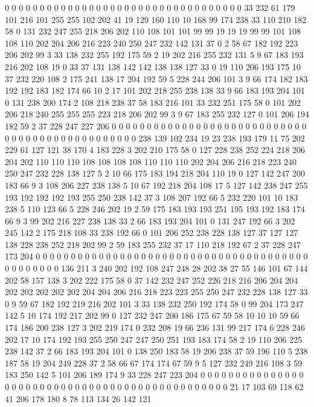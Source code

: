 0 0 0 0 0 0 0 0 0 0 0 0 0 0 0 0 0 0 0 0
0 0 0 0 0 0 0 0 0 0 0 0 0 0 33 232 61 179 101 216
101 255 255 102 202 41 19 129 160 110 10 168 99 174 238 33 110 210 182 58
0 131 232 247 255 218 206 202 110 108 101 101 99 99 19 19 19 99 99 101
108 108 110 202 204 206 216 223 240 250 247 232 142 131 37 0 2 58 67 182
192 223 206 202 99 3 33 138 232 255 192 175 59 2 19 202 216 255 232 131
5 9 67 183 193 216 202 108 19 0 33 37 131 138 142 142 138 138 127 33
0 19 110 206 193 175 10 37 232 220 108 2 175 241 138 17 204 192 59 5
228 244 206 101 3 9 66 174 182 183 192 192 183 182 174 66 10 2 17 101
202 218 255 238 138 33 9 66 183 193 204 101 0 131 238 200 174 2 108 218
238 37 58 183 216 101 33 232 251 175 58 0 101 202 206 218 240 255 255 255
223 218 206 202 99 3 9 67 183 255 232 127 0 101 206 194 182 59 2 37
228 247 227 206 0 0 0 0 0 0 0 0 0 0 0 0 0 0 0 0
0 0 0 0 0 0 0 0 0 0 0 0 0 0 0 0 0 0 0 0
0 0 0 0 0 0 0 0 0 0 0 238 139 102 234 19 23 238 193 179
11 75 202 229 61 127 121 38 170 4 183 228 3 202 210 175 58 0 127 228
238 252 224 218 206 204 202 110 110 110 108 108 108 108 110 110 110 202 204 206
216 218 223 240 250 247 232 228 138 127 5 2 10 66 175 183 194 218 204 110
19 0 127 142 247 200 183 66 9 3 108 206 227 238 138 5 10 67 192 218
204 108 17 5 127 142 238 247 255 193 192 192 192 193 255 250 238 142 37 3
108 207 192 66 5 232 220 101 10 183 238 5 110 123 66 5 228 246 202 19
2 59 175 183 193 193 251 195 193 192 183 174 66 9 3 99 202 216 227 238
138 33 2 66 183 193 204 101 0 131 247 192 66 3 202 245 142 2 175 218
108 33 238 192 66 0 101 206 252 238 228 138 127 37 127 127 138 228 238 252
218 202 99 2 59 183 255 232 37 17 110 218 192 67 2 37 228 247 173 204
0 0 0 0 0 0 0 0 0 0 0 0 0 0 0 0 0 0 0 0
0 0 0 0 0 0 0 0 0 0 0 0 0 0 0 0 0 0 0 0
0 0 0 0 0 0 0 136 211 3 240 202 192 108 247 248 28 202 38 27
55 146 101 67 144 202 58 157 138 3 202 222 175 58 0 37 142 232 247 252
226 218 216 206 204 204 202 202 202 202 202 204 204 206 216 218 223 223 255 250
247 232 228 138 127 33 0 9 59 67 182 192 219 216 202 101 3 33 138 232
250 192 174 58 0 99 204 173 247 142 5 10 174 192 217 202 99 0 127 232
247 200 186 175 67 59 58 10 10 10 59 66 174 186 200 238 127 3 202 219
174 0 232 208 19 66 236 131 99 217 174 6 228 246 202 17 10 174 192 193
255 250 247 247 250 251 193 183 174 58 2 19 110 206 225 238 142 37 2 66
183 193 204 101 0 138 250 183 58 19 206 238 37 59 196 110 5 238 187 58
19 204 249 228 37 2 58 66 67 174 174 67 59 9 5 127 232 249 216 108
3 59 183 250 142 5 101 206 189 174 9 33 228 247 223 204 0 0 0 0
0 0 0 0 0 0 0 0 0 0 0 0 0 0 0 0 0 0 0 0
0 0 0 0 0 0 0 0 0 0 0 0 0 0 0 0 0 0 0 0
0 0 0 21 17 103 69 118 62 41 206 178 180 8 78 113 134 26 142 121
